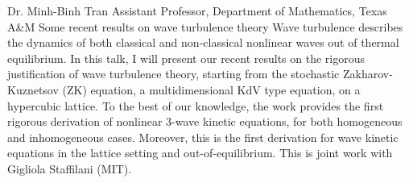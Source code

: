 \label{plenary4}
\plenabs
{Dr. Minh-Binh Tran}
{Assistant Professor, Department of Mathematics, Texas A\&M}
{Some recent results on wave turbulence theory}
{Wave turbulence describes the dynamics of both classical and non-classical nonlinear waves out of thermal equilibrium. In this talk, I will present our recent results on the rigorous justification of wave turbulence theory, starting from the stochastic Zakharov-Kuznetsov (ZK) equation, a multidimensional KdV type equation, on a hypercubic lattice. To the best of our knowledge, the work provides the first rigorous derivation of nonlinear 3-wave kinetic equations, for both homogeneous and inhomogeneous cases. Moreover, this is the first derivation for wave kinetic equations in the lattice setting and out-of-equilibrium. This is joint work with Gigliola Staffilani (MIT).}
